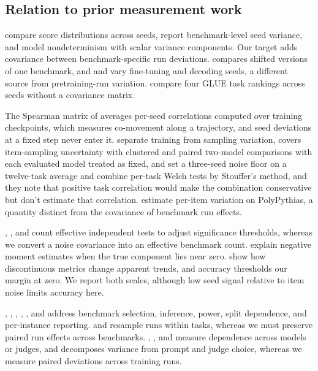 \subsection{Relation to prior measurement work}
\citet{reimers2017} compare score distributions across seeds, \citet{madaan2024} report benchmark-level seed variance, and \citet{hagmann2023} model nondeterminism with scalar variance components. Our target adds covariance between benchmark-specific run deviations. \citet{jordan2024} compares shifted versions of one benchmark, and \citet{bui2025} and \citet{hochlehnert2025} vary fine-tuning and decoding seeds, a different source from pretraining-run variation. \citet[Section 4.3]{dodge2020} compare four GLUE task rankings across seeds without a covariance matrix.

The Spearman matrix of \citet[Figure 3]{zhou2020} averages per-seed correlations computed over training checkpoints, which measures co-movement along a trajectory, and seed deviations at a fixed step never enter it. \citet{dufour2026} separate training from sampling variation, \citet{miller2024} covers item-sampling uncertainty with clustered and paired two-model comparisons with each evaluated model treated as fixed, and \citet{zhao2026} set a three-seed noise floor on a twelve-task average and combine per-task Welch tests by Stouffer's method, and they note that positive task correlation would make the combination conservative but don't estimate that correlation. \citet{haupt2026} estimate per-item variation on PolyPythias, a quantity distinct from the covariance of benchmark run effects.

\citet{cheverud2001}, \citet{nyholt2004}, and \citet{li2005} count effective independent tests to adjust significance thresholds, whereas we convert a noise covariance into an effective benchmark count. \citet{searle1992} explain negative moment estimates when the true component lies near zero. \citet{schaeffer2023} show how discontinuous metrics change apparent trends, and accuracy thresholds our margin at zero. We report both scales, although low seed signal relative to item noise limits accuracy here.

\citet{dehghani2021}, \citet{demsar2006}, \citet{dror2017}, \citet{card2020}, \citet{gorman2019}, and \citet{burnell2023} address benchmark selection, inference, power, split dependence, and per-instance reporting. \citet{henderson2018} and \citet{agarwal2021} resample runs within tasks, whereas we must preserve paired run effects across benchmarks. \citet{hardy2026}, \citet{kohli2026}, and \citet{sha2026} measure dependence across models or judges, and \citet{messing2026} decomposes variance from prompt and judge choice, whereas we measure paired deviations across training runs.


